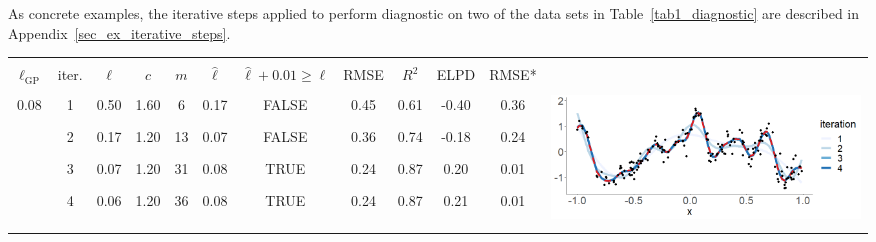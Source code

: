 As concrete examples, the iterative steps applied to perform diagnostic on two of the data sets in Table~\ref{tab1_diagnostic} are described in Appendix~\ref{sec_ex_iterative_steps}.

\begin{table}
\centering
\setlength{\tabcolsep}{5pt}
\begin{tabular}{ c c c c c c c c c c | c c}
\arrayrulecolor{gray}\hline \\[-3mm]
$\ell_{\text{GP}}$ & iter. & $\ell$ & $c$ & $m$ & $\hat{\ell}$ & $\hat{\ell} + 0.01 \geq \ell$ & RMSE & $R^2$ & ELPD & RMSE* & \\ 
\arrayrulecolor{lightgray}\hline \\[-1mm]
\multirow{5}{*}{ 0.08} 
 & 1 & 0.50 & 1.60 & 6 & 0.17 & FALSE & 0.45 & 0.61 & -0.40 & 0.36 & \multirow{5}{*}{ \includegraphics[scale=0.20, trim = 0mm 10mm 0mm 5mm, clip]{fig9_diagnostic_2.png}}\\
 & 2 & 0.17 & 1.20 & 13 & 0.07 & FALSE & 0.36 & 0.74 & -0.18 & 0.24 & \\
 & 3 & 0.07 & 1.20 & 31 & 0.08 & TRUE & 0.24 & 0.87 & 0.20 & 0.01 & \\
 & 4 & 0.06 & 1.20 & 36 & 0.08 & TRUE & 0.24 & 0.87 & 0.21 & 0.01 & \\
 \\[1mm]
 \arrayrulecolor{lightgray}\hline \\[-1mm]

\end{tabular}
\end{table}
